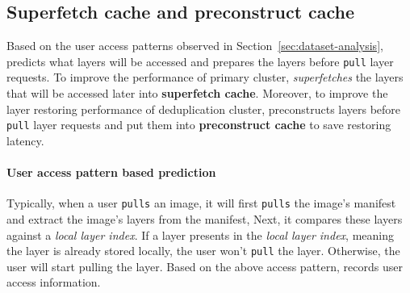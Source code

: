 
\subsection{Superfetch cache and preconstruct cache}
\label{sec:cache-design}


%

Based on the user access patterns observed in Section~\ref{sec:dataset-analysis},
\sysname predicts what layers will be accessed and prepares the layers before \texttt{pull} layer requests.
To improve the performance of primary cluster,
\sysname \emph{superfetches} the layers that will be accessed later into \textbf{superfetch cache}.
Moreover, 
to improve the layer restoring performance of deduplication cluster,
\sysname preconstructs layers before \texttt{pull} layer requests 
and put them into \textbf{preconstruct cache} to save restoring latency.

\paragraph{User access pattern based prediction}
Typically, when a user 
 \texttt{pulls} an image,
it will first \texttt{pulls} the image's manifest and extract the image's layers from the manifest, 
Next, it compares these layers against a \emph{local layer index}.
If a layer presents in the \emph{local layer index}, meaning the layer is already stored locally,
the user won't \texttt{pull} the layer.
Otherwise, the user will start pulling the layer.
Based on the above access pattern, 
\sysname records user access information.
 

%

